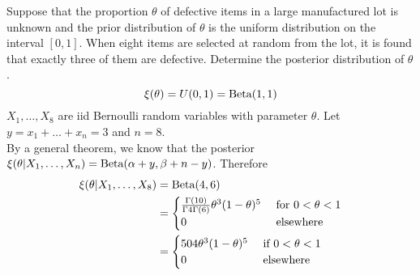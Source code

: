 \documentclass[12pt]{article}
\begin{document}
Suppose that the proportion $\theta$ of defective items in a large manufactured lot is unknown and the prior distribution of $\theta$ is the uniform distribution on the interval $[0,1]$. When eight items are selected at random from the lot, it is found that exactly three of them are defective. Determine the posterior distribution of $\theta$. \\ 
$$  \xi(\theta) = U(0,1) = \text{Beta}( 1,1 ) $$ 
$X_1,\dots, X_8$ are iid Bernoulli random variables with parameter $\theta$. Let $y = x_1 + \dots + x_n = 3$ and $n = 8$. \\ By a general theorem, we know that the posterior $\xi(\theta | X_1,\dots,X_n) = \text{Beta}( \alpha + y, \beta + n -y )$. Therefore 
$$ \begin{aligned} \xi(\theta | X_1,\dots,X_8) &= \text{Beta}( 4,6 ) \\ &= \begin{cases} \frac{\Gamma(10)}{\Gamma{4}\Gamma(6)} \theta^3 (1-\theta)^5 &\text{ for } 0 < \theta < 1 \\ 0 &\text{ elsewhere } \end{cases} \\ &= \begin{cases} 504\theta^3(1-\theta)^5 &\text{ if } 0 < \theta < 1 \\ 0 &\text{ elsewhere} \end{cases}  \end{aligned} $$ 
\end{document}
